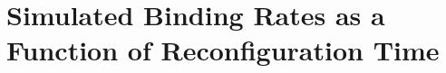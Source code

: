\documentclass[../talant.diss.submit.tex]{subfiles}
\begin{document}
%
%


\section{\textbf{Simulated Binding Rates as a Function of Reconfiguration Time}}\label{sect:rates_reconfig}
\end{document}
